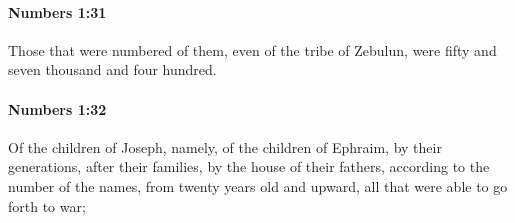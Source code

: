		\paragraph{Numbers 1:31} %
			\label{NUMBERS-1-31}

			Those that were numbered of them, even of the tribe of Zebulun, were fifty and seven thousand and four hundred.


		\paragraph{Numbers 1:32} %
			\label{NUMBERS-1-32}

			Of the children of Joseph, namely, of the children of Ephraim, by their generations, after their families, by the house of their fathers, according to the number of the names, from twenty years old and upward, all that were able to go forth to war;


